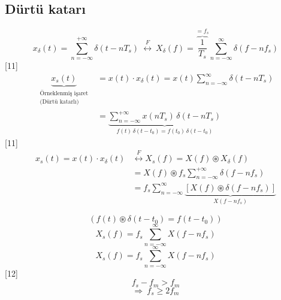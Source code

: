 \documentclass[11pt,a4paper]{article}
\begin{document}
\subsection{Dürtü katarı}
\[ x_\delta(t)=\sum_{n=-\infty}^{+\infty}\delta(t-nT_s)\ \overset{F}{\longleftrightarrow}\ X_\delta(f)=\overbrace{\frac{1}{T_s}}^{=f_s}\sum_{n=-\infty}^{\infty}\delta(f-nf_s) \]
[11]
\[ \begin{aligned}
\underbrace{x_s(t)}_{\substack{\text{Örneklenmiş işaret}\\\text{(Dürtü katarlı)}}} &= x(t)\cdot x_\delta(t)=x(t)\sum_{n=-\infty}^{\infty}\delta(t-nT_s)\\
&=\underbrace{\sum_{n=-\infty}^{+\infty}x(nT_s)\,\delta(t-nT_s)}_{f(t)\,\delta(t-t_0)=f(t_0)\,\delta(t-t_0)}
\end{aligned} \]
[11]
\[ \begin{aligned} x_s(t)=x(t)\cdot x_\delta(t)&\overset{F}{\longleftrightarrow}X_s(f)=X(f)\circledast X_\delta(f)\\ &=X(f)\circledast f_s\sum_{n=-\infty}^{+\infty}\delta(f-nf_s)\\ &=f_s\sum_{n=-\infty}^{\infty}\underbrace{\left[X(f)\circledast\delta(f-nf_s)\right]}_{X(f-nf_s)} \end{aligned} \]

\[ \left(f(t)\circledast\delta(t-t_0)=f(t-t_0)\right) \]
\[ X_s(f)=f_s\sum_{n=-\infty}^{\infty}X(f-nf_s) \]
\[ X_s(f)=f_s\sum_{n=-\infty}^{\infty}X(f-nf_s) \]
[12]
\[ f_s-f_m>f_m \]
\[ \Rightarrow\ f_s\ge 2f_m \]
\end{document}
